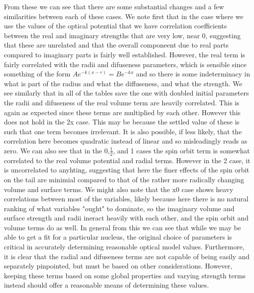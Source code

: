 \documentclass[11pt]{article} %
\begin{document}
From these we can see that there are some substantial changes and a few similarities between each of these cases. We note first that in the case where we use the values of the optical potential that we have correlation coefficients between the real and imaginary strengths  that are very low, near 0, suggesting that these are unrelated and that the overall componeent due to real parts compared to imaginary parts is fairly well established. However, the real term is fairly correlated with the radii and difuseness parameters, which is sensible since something of the form $Ae^{-k(x-r)}=Be^{-kx}$ and so there is some indeterminacy in what is part of the radius and what the diffuseness, and what the strength. We see similarly that in all of the tables save the one with doubled initial parameters the radii and difuseness of the real volume term are heavily correlated. This is again as expected since these terms are multiplied by each other. However this does not hold in the 2x case. This may be because the settled value of these is such that one term becomes irrelevant. It is also possible, if less likely, that the correlation here becomes quadratic instead of linear and so misleadingly reads as zero. We can also see that in the 0,$\frac{1}{2}$, and 1 cases the spin orbit term is somewhat correlated to the real volume potential and radial terms. However in the 2 case, it is uncorrelated to anyhting, suggesting that here the finer effects of the spin orbit on the tail are minimial compared to that of the rather more radically changing volume and surface terms. We might also note that the x0 case shows heavy correlations between most of the variables, likely because here there is no natural ranking of what variables "ought" to dominate, so the imaginary volume and surface strength and radii ineract heavily with each other, and the spin orbit and volume terms do as well. In general from this we can see that while we may be able to get a fit for a particular nucleus, the original choice of parameters is critical in accurately determining reasonable optical model values. Furthermore, it is clear that the radial and difuseness terms are not capable of being easily and separately pinpointed, but must be based on other considerations. However, keeping these terms based on some global properties and varying strength terms instead should offer a reasonable means of determining these values.
\end{document}
